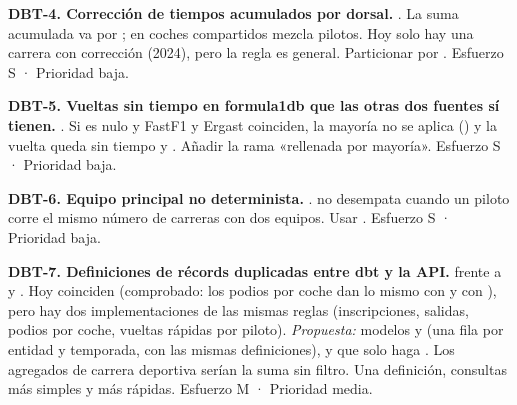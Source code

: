 \textbf{DBT-4. Corrección de tiempos acumulados por dorsal.} . La suma acumulada va por ; en coches compartidos mezcla pilotos. Hoy solo hay una carrera con corrección (2024), pero la regla es general. Particionar por . Esfuerzo S · Prioridad baja.

\textbf{DBT-5. Vueltas sin tiempo en formula1db que las otras dos fuentes sí tienen.} . Si  es nulo y FastF1 y Ergast coinciden, la mayoría no se aplica () y la vuelta queda sin tiempo y . Añadir la rama «rellenada por mayoría». Esfuerzo S · Prioridad baja.

\textbf{DBT-6. Equipo principal no determinista.} .  no desempata cuando un piloto corre el mismo número de carreras con dos equipos. Usar . Esfuerzo S · Prioridad baja.

\textbf{DBT-7. Definiciones de récords duplicadas entre dbt y la API.}  frente a  y . Hoy coinciden (comprobado: los podios por coche dan lo mismo con  y con ), pero hay dos implementaciones de las mismas reglas (inscripciones, salidas, podios por coche, vueltas rápidas por piloto). \emph{Propuesta:} modelos  y  (una fila por entidad y temporada, con las mismas definiciones), y que  solo haga . Los agregados de carrera deportiva serían la suma sin filtro. Una definición, consultas más simples y más rápidas. Esfuerzo M · Prioridad media.


